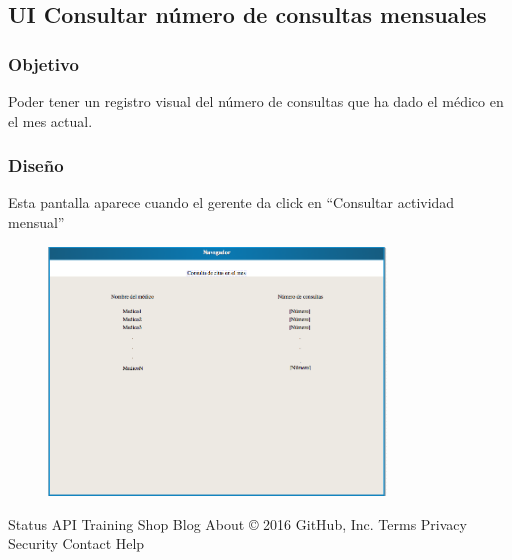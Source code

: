 \subsection{UI Consultar número de consultas mensuales}
\subsubsection{Objetivo}
Poder tener un registro visual del número de consultas que ha dado el médico en el mes actual.
\subsubsection{Diseño}
   Esta pantalla aparece cuando el gerente da click en ``Consultar actividad mensual'' 


\begin{figure}[htbp!]
        \centering
            \includegraphics[width=0.8\textwidth]{images/consultaCitasMes}
            
            
    \end{figure}



Status API Training Shop Blog About
© 2016 GitHub, Inc. Terms Privacy Security Contact Help
